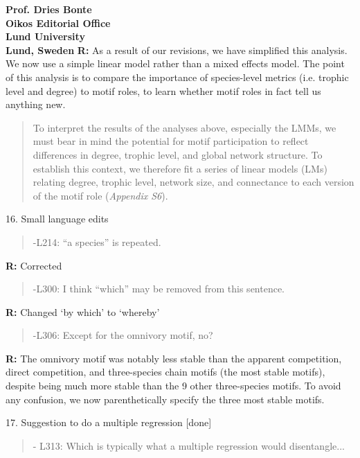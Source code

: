 \documentclass[12pt]{letter}
\begin{document}
\begin{letter}{\bf Prof. Dries Bonte\\
Oikos Editorial Office \\
Lund University \\
Lund, Sweden}
      \textbf{R:} 
      As a result of our revisions, we have simplified this analysis. We now use a simple linear model rather than a mixed effects model. The point of this analysis is to compare the importance of species-level metrics (i.e. trophic level and degree) to motif roles, to learn whether motif roles in fact tell us anything new.
      
      \begin{quotation}
      To interpret the results of the analyses above, especially the LMMs, we must bear in mind the potential for motif participation to reflect differences in degree, trophic level, and global network structure. 
      To establish this context, we therefore fit a series of linear models (LMs) relating degree, trophic level, network size, and connectance to each version of the motif role (\emph{Appendix S6}). 
      \end{quotation}
      


    16. Small language edits 
    
    \begin{quotation}
      -L214: ``a species'' is repeated.
   \end{quotation}


        \textbf{R:} Corrected

    \begin{quotation}
      -L300: I think ``which'' may be removed from this sentence.
      \end{quotation}

        \textbf{R:} Changed `by which' to `whereby'

    \begin{quotation}
      -L306: Except for the omnivory motif, no?
      \end{quotation}

        \textbf{R:} The omnivory motif was notably less stable than the apparent competition, direct competition, and three-species chain motifs (the most stable motifs), despite being much more stable than the 9 other three-species motifs. To avoid any confusion, we now parenthetically specify the three most stable motifs.


    17. Suggestion to do a multiple regression [done]

    \begin{quotation}
      - L313: Which is typically what a multiple regression would disentangle...
      \end{quotation}


\end{letter}
\end{document}
